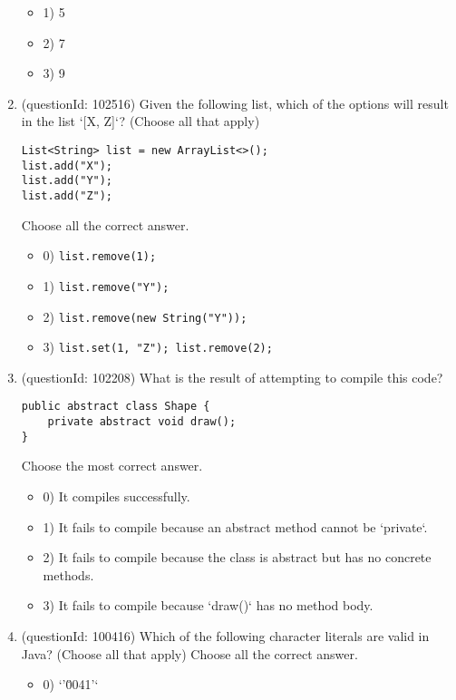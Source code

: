 \documentclass[12pt]{article}
\begin{document}
\begin{enumerate}[label=(\arabic*)]
\begin{itemize}
\item 1) 5

\item 2) 7

\item 3) 9

\end{itemize}
\item (questionId: 102516) Given the following list, which of the options will result in the list `[X, Z]`? (Choose all that apply)\begin{verbatim}
List<String> list = new ArrayList<>();
list.add("X");
list.add("Y");
list.add("Z");
\end{verbatim}
Choose all the correct answer.\begin{itemize}
\item 0) \verb|list.remove(1);|

\item 1) \verb|list.remove("Y");|

\item 2) \verb|list.remove(new String("Y"));|

\item 3) \verb|list.set(1, "Z"); list.remove(2);|

\end{itemize}
\item (questionId: 102208) What is the result of attempting to compile this code?\n\begin{verbatim}
public abstract class Shape {
    private abstract void draw();
}
\end{verbatim}
Choose the most correct answer. 
\begin{itemize}
\item 0) It compiles successfully.

\item 1) It fails to compile because an abstract method cannot be `private`.

\item 2) It fails to compile because the class is abstract but has no concrete methods.

\item 3) It fails to compile because `draw()` has no method body.

\end{itemize}
\item (questionId: 100416) Which of the following character literals are valid in Java? (Choose all that apply)
Choose all the correct answer.\begin{itemize}
\item 0) `'\u0041'`


\end{itemize}
\end{enumerate}
\end{document}
